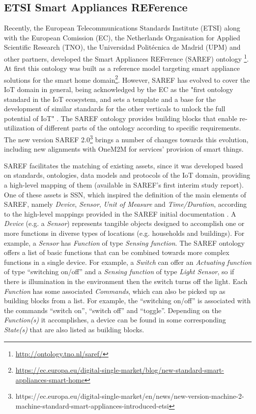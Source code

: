 \documentclass{sig-alternate-05-2015}
\begin{document}

\subsection{ETSI Smart Appliances REFerence}
Recently, the European Telecommunications Standards Institute (ETSI) along with the European Comission (EC), the Netherlands Organisation for Applied Scientific Research (TNO), the Universidad Politécnica de Madrid (UPM) and other partners, developed the Smart Appliances REFerence (SAREF) ontology \cite{Daniele2015,Daniele2016}\footnote{\url{http://ontology.tno.nl/saref/}}. At first this ontology was built as a reference model targeting smart appliance solutions for the smart home domain\footnote{\url{https://ec.europa.eu/digital-single-market/blog/new-standard-smart-appliances-smart-home}}. However, SAREF has evolved to cover the IoT domain in general, being acknowledged by the EC as the "first ontology standard in the IoT ecosystem, and sets a template and a base for the development of similar standards for the other verticals to unlock the full potential of IoT" \cite{Daniele2016b}. The SAREF ontology provides building blocks that enable re-utilization of different parts of the ontology according to specific requirements. The new version SAREF 2.0\footnote{https://ec.europa.eu/digital-single-market/en/news/new-version-machine-2-machine-standard-smart-appliances-introduced-etsi} brings a number of changes towards this evolution, including new alignments with OneM2M for services' provision of smart things. 

SAREF facilitates the matching of existing assets, since it was developed based on standards, ontologies, data models and protocols of the IoT domain, providing a high-level mapping of them (available in SAREF's first interim study report). One of these assets is SSN, which inspired the definition of the main elements of SAREF, namely \textit{Device}, \textit{Sensor}, \textit{Unit of Measure} and \textit{Time/Duration}, according to the high-level mappings provided in the SAREF initial documentation \cite{Daniele2015}. A \textit{Device} (e.g. a \textit{Sensor}) represents tangible objects designed to accomplish one or more functions in diverse types of locations (e.g. households and buildings). For example, a \textit{Sensor} has \textit{Function} of type \textit{Sensing function}. The SAREF ontology offers a list of basic functions that can be combined towards more complex functions in a single device. For example, a \textit{Switch} can offer an \textit{Actuating function} of type “switching on/off” and a \textit{Sensing function} of type \textit{Light Sensor}, so if there is illumination in the environment then the switch turns off the light. Each \textit{Function} has some associated \textit{Commands}, which can also be picked up as building blocks from a list. For example, the “switching on/off” is associated with the commands “switch on”, “switch off” and “toggle”. Depending on the \textit{Function(s)} it accomplishes, a device can be found in some corresponding \textit{State(s)} that are also listed as building blocks. 
\end{document}

